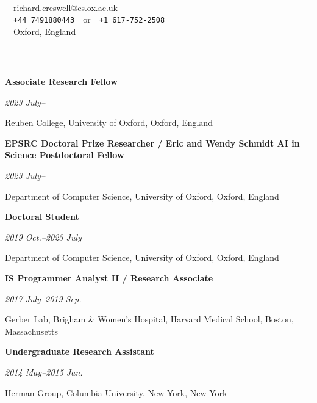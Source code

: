 \documentclass[10pt]{article}
\begin{document}
\noindent\parbox{.3\textwidth}{\LARGE \textbf{}}
\parbox{.3\textwidth}{~}
\parbox{.4\textwidth}{
\-\hspace{0cm}{\faEnvelopeO}~~richard.creswell@cs.ox.ac.uk\\
\-\hspace{0cm}{\faWhatsapp}~~\texttt{\footnotesize +44 7491880443}~~or~~\texttt{\footnotesize +1 617-752-2508}\\
{ \faHome}~~Oxford, England
}

\vspace{0.6cm}



\vspace{-2.75mm} \\
\rule{\textwidth}{0.4pt}
\vspace{0.1mm}
\noindent\parbox{.65\textwidth}{\raggedright  \textbf{Associate Research Fellow}}
\parbox{.35\textwidth}{\raggedleft \emph{2023 July--}}
Reuben College, University of Oxford, Oxford, England

\vspace{0.4cm}

\noindent\parbox{.85\textwidth}{\raggedright  \textbf{EPSRC Doctoral Prize Researcher / Eric and Wendy Schmidt AI in Science Postdoctoral Fellow}}
\parbox{.15\textwidth}{\raggedleft \emph{2023 July--}}
Department of Computer Science, University of Oxford, Oxford, England

\vspace{0.4cm}




\noindent\parbox{.65\textwidth}{\raggedright  \textbf{Doctoral Student}}
\parbox{.35\textwidth}{\raggedleft \emph{2019 Oct.--2023 July}}
Department of Computer Science, University of Oxford, Oxford, England


\vspace{0.4cm}

\noindent\parbox{.75\textwidth}{\raggedright \textbf{IS Programmer Analyst II / Research Associate}}
\parbox{.25\textwidth}{\raggedleft \emph{2017 July--2019 Sep.}}
Gerber Lab, Brigham \& Women's Hospital, Harvard Medical School, Boston, Massachusetts


\vspace{0.4cm}

\noindent\parbox{.75\textwidth}{\raggedright \textbf{Undergraduate Research Assistant}}
\parbox{.25\textwidth}{\raggedleft \emph{2014 May--2015 Jan.}}
Herman Group, Columbia University, New York, New York
\end{document}
